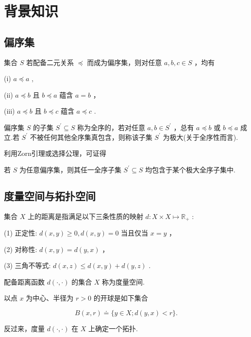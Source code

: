 \chapter{背景知识}

\section{偏序集}

集合 $S$ 若配备二元关系 $\preccurlyeq$ 而成为偏序集，则对任意 $a,b,c \in  S$ ，均有

(i) $a \preccurlyeq  a$ ,

(ii) $a \preccurlyeq  b$ 且 $b \preccurlyeq  a$ 蕴含 $a = b$ ，

(iii) $a \preccurlyeq  b$ 且 $b \preccurlyeq  c$ 蕴含 $a \preccurlyeq  c$ .

偏序集 $S$ 的子集 ${S}^{\prime } \subseteq  S$ 称为全序的，若对任意 $a,b \in  {S}^{\prime }$ ，总有 $a \preccurlyeq  b$ 或 $b \preccurlyeq  a$ 成立.若 ${S}^{\prime }$ 不被任何其他全序集真包含，则称该子集 ${S}^{\prime }$ 为极大(关于全序性而言).

利用Zorn引理或选择公理，可证得

\begin{theorem}[Hausdorff极大性原理]\label{thm:app-A-1}
若 $S$ 为任意偏序集，则其任一全序子集 ${S}^{\prime } \subseteq  S$ 均包含于某个极大全序子集中.
\end{theorem}

\section{度量空间与拓扑空间}

集合 $X$ 上的距离是指满足以下三条性质的映射 $d : X \times  X \mapsto  {\mathbb{R}}_{ + }$ :

(1) 正定性: $d\left( {x,y}\right)  \geq  0,d\left( {x,y}\right)  = 0$ 当且仅当 $x = y$ ，

(2) 对称性: $d\left( {x,y}\right)  = d\left( {y,x}\right)$ ，

(3) 三角不等式: $d\left( {x,z}\right)  \leq  d\left( {x,y}\right)  + d\left( {y,z}\right)$ .

配备距离函数 $d\left( {\cdot , \cdot  }\right)$ 的集合 $X$ 称为度量空间.

以点 $x$ 为中心、半径为 $r > 0$ 的开球是如下集合

\[
B\left( {x,r}\right)  \doteq  \{ y \in  X;d\left( {y,x}\right)  < r\} .
\]

反过来，度量 $d\left( {\cdot , \cdot  }\right)$ 在 $X$ 上确定一个拓扑.

